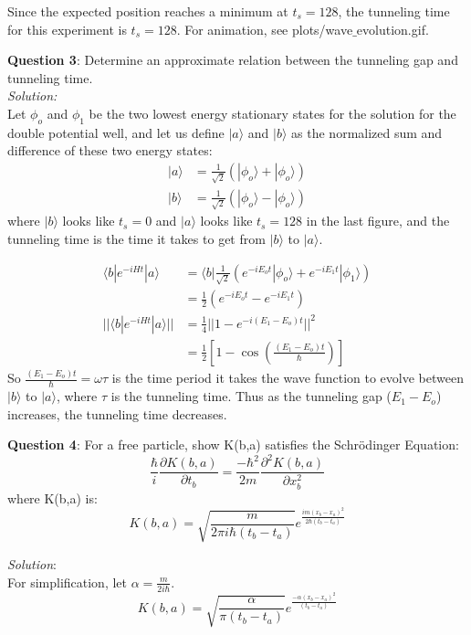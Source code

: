 \documentclass{article}
\begin{document}
Since the expected position reaches a minimum at $t_s=128$, the tunneling time for this experiment is $t_s=128$. For animation, see plots/wave$\_$evolution.gif.


\bigskip
\textbf{Question 3}: Determine an approximate relation between the tunneling gap and tunneling time. \\

\textit{Solution:} \\
Let $\phi_o$ and $\phi_1$ be the two lowest energy stationary states for the solution for the double potential well, and let us define $|a\rangle$ and $|b\rangle$ as the normalized sum and difference of these two energy states:
\begin{align*}
	|a\rangle &= \frac{1}{\sqrt{2}} \left(|\phi_o\rangle + |\phi_o\rangle \right) \\
	|b\rangle &= \frac{1}{\sqrt{2}} \left(|\phi_o\rangle - |\phi_o\rangle \right)
\end{align*}
where $|b\rangle$ looks like $t_s=0$ and $|a\rangle$ looks like $t_s=128$ in the last figure, and the tunneling time is the time it takes to get from $|b\rangle$ to $|a\rangle$. 

\begin{align*}
	\langle b| e^{-iHt} |a \rangle 
	&= \langle b | \frac{1}{\sqrt{2}} \left(e^{-iE_ot} | \phi_o \rangle + e^{-iE_1t} | \phi_1 \rangle \right) \\ 
	&= \frac{1}{2} \left(e^{-iE_ot} - e^{-iE_1t} \right) \\
	||\langle b| e^{-iHt} |a \rangle || 
	&= \frac{1}{4} || 1 - e^{-i(E_1 - E_o)t} ||^2 \\
	&= \frac{1}{2} \left[1 - \cos\left(\frac{(E_1 - E_o)t}{\hbar} \right) \right]
\end{align*}
So $\frac{(E_1 - E_o)t}{\hbar} = \omega \tau$ is the time period it takes the wave function to evolve between $|b\rangle$ to $|a\rangle$, where $\tau$ is the tunneling time. Thus as the tunneling gap ($E_1 - E_o$) increases, the tunneling time decreases.


\bigskip
\textbf{Question 4}: For a free particle, show K(b,a) satisfies the Schr\"odinger Equation:
\[\frac{\hbar}{i} \frac{\partial K(b,a)}{\partial t_b} = \frac{-\hbar^2}{2m} \frac{\partial^2 K(b,a)}{\partial x_b^2} \]
where K(b,a) is:
\[K(b,a) = \sqrt{\frac{m}{2\pi i \hbar (t_b - t_a)}} e^{\frac{i m (x_b - x_a)^2}{2\hbar (t_b - t_a)}} \]

\textit{Solution}: \\
For simplification, let $\alpha = \frac{m}{2i\hbar}$.
\[K(b,a) = \sqrt{\frac{\alpha}{\pi (t_b - t_a)}} e^{\frac{-\alpha (x_b - x_a)^2}{(t_b - t_a)}} \]
\end{document}
